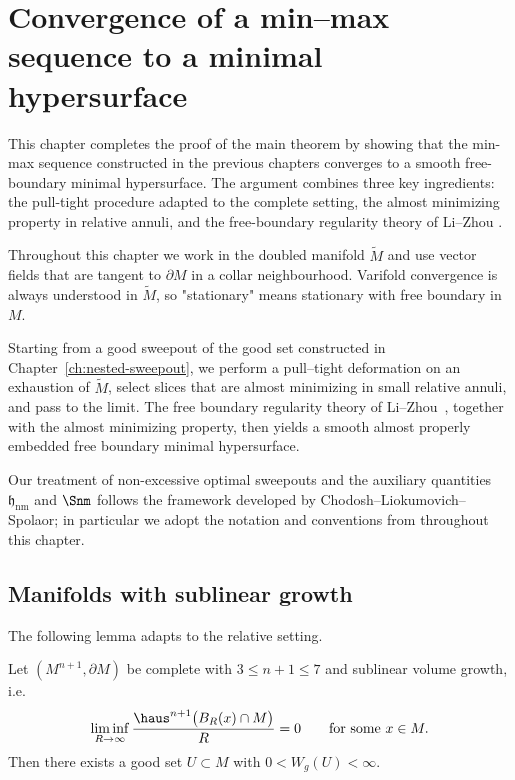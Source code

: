 \chapter{Convergence of a min--max sequence to a minimal hypersurface}\label{ch:convergence-of-min-max}

This chapter completes the proof of the main theorem by showing that the min-max sequence constructed in the previous chapters converges to a smooth free-boundary minimal hypersurface. The argument combines three key ingredients: the pull-tight procedure adapted to the complete setting, the almost minimizing property in relative annuli, and the free-boundary regularity theory of Li--Zhou \cite{LZ17}.

Throughout this chapter we work in the doubled manifold $\widetilde M$ and use vector fields that are tangent to $\partial M$ in a collar neighbourhood. Varifold convergence is always understood in $\widetilde M$, so "stationary" means stationary with free boundary in $M$.

Starting from a good sweepout of the good set constructed in Chapter~\ref{ch:nested-sweepout}, we perform a pull--tight deformation on an exhaustion of $\widetilde M$, select slices that are almost minimizing in small relative annuli, and pass to the limit. The free boundary regularity theory of Li--Zhou~\cite{LZ17}, together with the almost minimizing property, then yields a smooth almost properly embedded free boundary minimal hypersurface.

Our treatment of non-excessive optimal sweepouts and the auxiliary quantities $\mathfrak{h}_{\mathrm{nm}}$ and $\Snm$ follows the framework developed by Chodosh--Liokumovich--Spolaor; in particular we adopt the notation and conventions from \cite{CLS22} throughout this chapter.

\section{Manifolds with sublinear growth}\label{sec:sublinear-width}
The following lemma adapts \cite[§8.1]{CL20} to the relative setting.

\begin{lemma}\label{lem:good-set-sublinear}
Let $(M^{n+1},\partial M)$ be complete with $3\le n+1\le 7$ and sublinear volume growth, i.e.
\[
\liminf_{R\to\infty}\frac{\haus^{n+1}\bigl(B_R(x)\cap M\bigr)}{R}=0
\qquad\text{for some }x\in M.
\]
Then there exists a good set $U\subset M$ with $0<W_g(U)<\infty$.
\end{lemma}

